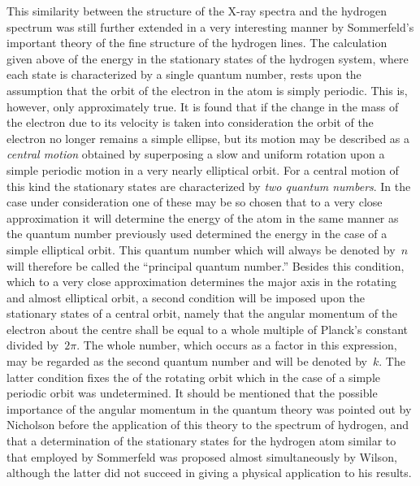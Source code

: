  This similarity between
the structure of the X-ray spectra and the hydrogen spectrum
was still further extended in a very interesting manner by Sommerfeld's
important theory of the fine structure of the hydrogen lines.
The calculation given above of the energy in the stationary states
of the hydrogen system, where each state is characterized by a
single quantum number, rests upon the assumption that the orbit
of the electron in the atom is simply periodic. This is, however,
only approximately true. It is found that if the change in the mass
of the electron due to its velocity is taken into consideration the
orbit of the electron no longer remains a simple ellipse, but its
motion may be described as a \emph{central motion} obtained by superposing
a slow and uniform rotation upon a simple periodic motion in a
very nearly elliptical orbit. For a central motion of this kind the
stationary states are characterized by \emph{two quantum numbers}. In the
case under consideration one of these may be so chosen that to a
very close approximation it will determine the energy of the atom
in the same manner as the quantum number previously used
determined the energy in the case of a simple elliptical orbit. This
quantum number which will always be denoted by~$n$ will therefore
be called the ``principal quantum number.'' Besides this condition,
which to a very close approximation determines the major axis in the
rotating and almost elliptical orbit, a second condition will be imposed
upon the stationary states of a central orbit, namely that the angular
momentum of the electron about the centre shall be equal to a whole
multiple of Planck's constant divided by~$2\pi$. The whole number, which
occurs as a factor in this expression, may be regarded as the second
quantum number and will be denoted by~$k$. The latter condition fixes
the  of the rotating orbit which in the case of a simple
periodic orbit was undetermined. It should be mentioned that the
possible importance of the angular momentum in the quantum theory
was pointed out by Nicholson before the application of this theory to
the spectrum of hydrogen, and that a determination of the stationary
states for the hydrogen atom similar to that employed by Sommerfeld
was proposed almost simultaneously by Wilson, although the
latter did not succeed in giving a physical application to his results.

